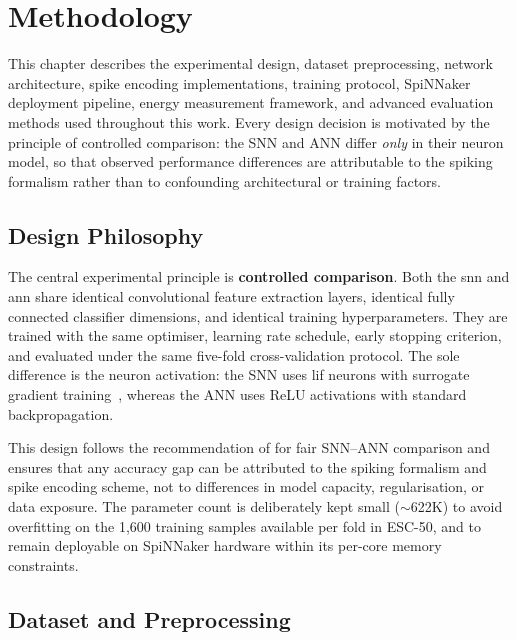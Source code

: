 \chapter{Methodology}
\label{ch:methodology}

This chapter describes the experimental design, dataset preprocessing, network architecture, spike encoding implementations, training protocol, SpiNNaker deployment pipeline, energy measurement framework, and advanced evaluation methods used throughout this work. Every design decision is motivated by the principle of controlled comparison: the SNN and ANN differ \emph{only} in their neuron model, so that observed performance differences are attributable to the spiking formalism rather than to confounding architectural or training factors.

\section{Design Philosophy}
\label{sec:design-philosophy}

The central experimental principle is \textbf{controlled comparison}. Both the \gls{snn} and \gls{ann} share identical convolutional feature extraction layers, identical fully connected classifier dimensions, and identical training hyperparameters. They are trained with the same optimiser, learning rate schedule, early stopping criterion, and evaluated under the same five-fold cross-validation protocol. The sole difference is the neuron activation: the SNN uses \gls{lif} neurons with surrogate gradient training~\citep{neftci2019surrogate}, whereas the ANN uses ReLU activations with standard backpropagation.

This design follows the recommendation of \citet{deng2021optimal} for fair SNN--ANN comparison and ensures that any accuracy gap can be attributed to the spiking formalism and spike encoding scheme, not to differences in model capacity, regularisation, or data exposure. The parameter count is deliberately kept small ($\sim$622K) to avoid overfitting on the 1,600 training samples available per fold in ESC-50, and to remain deployable on SpiNNaker hardware within its per-core memory constraints.

\section{Dataset and Preprocessing}
\label{sec:dataset}

